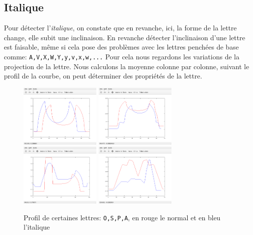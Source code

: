 \documentclass[a4paper,12pt,titlepage]{report}
\begin{document}
	\subsection{Italique}
	Pour détecter l'\textit{italique}, on constate que en revanche, ici, la forme de la lettre change, elle subit une inclinaison.
	En revanche détecter l'inclinaison d'une lettre est faisable, même si cela pose des problèmes avec les lettres penchées de base comme: \texttt{A,V,X,W,Y,y,v,x,w,...}
	Pour cela nous regardons les variations de la projection de la lettre. Nous calculons la moyenne colonne par colonne, suivant le profil de la courbe, on peut déterminer des propriétés de la lettre.
	\begin{figure}[h]
	\centering
		\includegraphics[width=0.35\textwidth]{../illus/comp/projO.png}
		\includegraphics[width=0.35\textwidth]{../illus/comp/projS.png}\\
		\includegraphics[width=0.35\textwidth]{../illus/comp/projP.png}
		\includegraphics[width=0.35\textwidth]{../illus/comp/projA.png}
		\caption{Profil de certaines lettres: \texttt{O,S,P,A}, en rouge le normal et en bleu l'italique}
	\end{figure}
\end{document}
